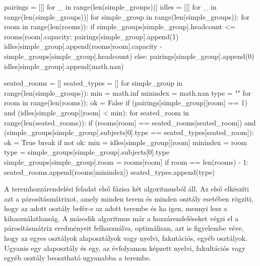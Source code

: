 \documentclass[12pt,a4paper]{report}
\begin{document}
\begin{python}
pairings = [[] for _ in range(len(simple_groups))]
idles = [[] for _ in range(len(simple_groups))]
for simple_group in range(len(simple_groups)):
    for room in range(len(rooms)):
        if simple_groups[simple_group].headcount <= rooms[room].capacity:
            pairings[simple_group].append(1)
            idles[simple_group].append(rooms[room].capacity - simple_groups[simple_group].headcount)
        else:
            pairings[simple_group].append(0)
            idles[simple_group].append(math.nan)

seated_rooms = []
seated_types = []
for simple_group in range(len(simple_groups)):
    min = math.inf
    minindex = math.nan
    type = ""
    for room in range(len(rooms)):
        ok = False
        if (pairings[simple_group][room] == 1) and (idles[simple_group][room] < min):
            for seated_room in range(len(seated_rooms)):
                if (rooms[room] == seated_rooms[seated_room]) and (simple_groups[simple_group].subjects[0].type == seated_types[seated_room]):
                    ok = True
                    break
            if not ok:
                min = idles[simple_group][room]
                minindex = room
                type = simple_groups[simple_group].subjects[0].type
                simple_groups[simple_group].room = rooms[room]
        if room == len(rooms) - 1:
            seated_rooms.append(rooms[minindex])
            seated_types.append(type)
\end{python}

A teremhozzárendelési feladat első fázisa két algoritmusból áll. Az első elkészíti azt a párosításmátrixot, amely minden terem és minden osztály esetében rögzíti, hogy az adott osztály befér-e az adott terembe és ha igen, mennyi lesz a kihasználatlanság. A második algoritmus már a hozzárendeléseket végzi el a párosításmátrix eredményeit felhasználva, optimálisan, azt is figyelembe véve, hogy az egyes osztályok alaposztályok vagy nyelvi, fakutációs, egyéb osztályok. Ugyanis egy alaposztály és egy, az évfolyamon képzett nyelvi, fakultációs vagy egyéb osztály beosztható ugyanabba a terembe.
\end{document}
